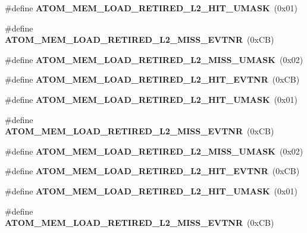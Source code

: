 \begin{DoxyCompactItemize}
\item 
\#define {\bfseries A\+T\+O\+M\+\_\+\+M\+E\+M\+\_\+\+L\+O\+A\+D\+\_\+\+R\+E\+T\+I\+R\+E\+D\+\_\+\+L2\+\_\+\+H\+I\+T\+\_\+\+U\+M\+A\+SK}~(0x01)\label{types_8h_a692622a84797600e7b04df9a1eacc475}

\item 
\#define {\bfseries A\+T\+O\+M\+\_\+\+M\+E\+M\+\_\+\+L\+O\+A\+D\+\_\+\+R\+E\+T\+I\+R\+E\+D\+\_\+\+L2\+\_\+\+M\+I\+S\+S\+\_\+\+E\+V\+T\+NR}~(0x\+C\+B)\label{types_8h_a3c0d272f11177100e9b18f3772efe0e2}

\item 
\#define {\bfseries A\+T\+O\+M\+\_\+\+M\+E\+M\+\_\+\+L\+O\+A\+D\+\_\+\+R\+E\+T\+I\+R\+E\+D\+\_\+\+L2\+\_\+\+M\+I\+S\+S\+\_\+\+U\+M\+A\+SK}~(0x02)\label{types_8h_a61f57e34652a6d1477797b48401801da}

\item 
\#define {\bfseries A\+T\+O\+M\+\_\+\+M\+E\+M\+\_\+\+L\+O\+A\+D\+\_\+\+R\+E\+T\+I\+R\+E\+D\+\_\+\+L2\+\_\+\+H\+I\+T\+\_\+\+E\+V\+T\+NR}~(0x\+C\+B)\label{types_8h_ae22b6f56994cf7ace060db72ae78ed02}

\item 
\#define {\bfseries A\+T\+O\+M\+\_\+\+M\+E\+M\+\_\+\+L\+O\+A\+D\+\_\+\+R\+E\+T\+I\+R\+E\+D\+\_\+\+L2\+\_\+\+H\+I\+T\+\_\+\+U\+M\+A\+SK}~(0x01)\label{types_8h_a692622a84797600e7b04df9a1eacc475}

\item 
\#define {\bfseries A\+T\+O\+M\+\_\+\+M\+E\+M\+\_\+\+L\+O\+A\+D\+\_\+\+R\+E\+T\+I\+R\+E\+D\+\_\+\+L2\+\_\+\+M\+I\+S\+S\+\_\+\+E\+V\+T\+NR}~(0x\+C\+B)\label{types_8h_a3c0d272f11177100e9b18f3772efe0e2}

\item 
\#define {\bfseries A\+T\+O\+M\+\_\+\+M\+E\+M\+\_\+\+L\+O\+A\+D\+\_\+\+R\+E\+T\+I\+R\+E\+D\+\_\+\+L2\+\_\+\+M\+I\+S\+S\+\_\+\+U\+M\+A\+SK}~(0x02)\label{types_8h_a61f57e34652a6d1477797b48401801da}

\item 
\#define {\bfseries A\+T\+O\+M\+\_\+\+M\+E\+M\+\_\+\+L\+O\+A\+D\+\_\+\+R\+E\+T\+I\+R\+E\+D\+\_\+\+L2\+\_\+\+H\+I\+T\+\_\+\+E\+V\+T\+NR}~(0x\+C\+B)\label{types_8h_ae22b6f56994cf7ace060db72ae78ed02}

\item 
\#define {\bfseries A\+T\+O\+M\+\_\+\+M\+E\+M\+\_\+\+L\+O\+A\+D\+\_\+\+R\+E\+T\+I\+R\+E\+D\+\_\+\+L2\+\_\+\+H\+I\+T\+\_\+\+U\+M\+A\+SK}~(0x01)\label{types_8h_a692622a84797600e7b04df9a1eacc475}

\item 
\#define {\bfseries A\+T\+O\+M\+\_\+\+M\+E\+M\+\_\+\+L\+O\+A\+D\+\_\+\+R\+E\+T\+I\+R\+E\+D\+\_\+\+L2\+\_\+\+M\+I\+S\+S\+\_\+\+E\+V\+T\+NR}~(0x\+C\+B)\label{types_8h_a3c0d272f11177100e9b18f3772efe0e2}


\end{DoxyCompactItemize}
